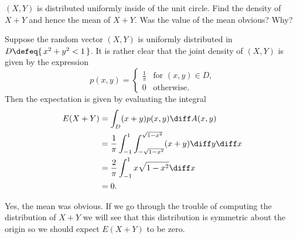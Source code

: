 \begin{problem}[Handout 18, \# 15]
  \((X,Y)\) is distributed uniformly inside of the unit circle. Find the
  density of \(X+Y\) and hence the mean of \(X+Y\). Was the value of the
  mean obvious? Why?
\end{problem}
\begin{solution}
  Suppose the random vector \((X,Y)\) is uniformly distributed in
  \(D\defeq \{\,x^2+y^2<1\,\}\). It is rather clear that the joint density
  of \((X,Y)\) is given by the expression
  \[
    p(x,y)=
    \begin{cases}
      \frac{1}{\pi}&\text{for \((x,y)\in D\),}\\
      0&\text{otherwise.}
    \end{cases}
  \]
  Then the expectation is given by evaluating the integral
  \begin{align*}
    E(X+Y)
    &=\int_D (x+y)p(x,y)\diff A(x,y)\\
    &=\frac{1}{\pi}\int_{-1}^1\int_{-\sqrt{1-x^2}}^{\sqrt{1-x^2}} (x+y)\diff
      y\diff x\\
    &=\frac{2}{\pi}\int_{-1}^1x\sqrt{1-x^2}\diff x\\
    &=0.
  \end{align*}

  Yes, the mean was obvious. If we go through the trouble of computing the
  distribution of \(X+Y\) we will see that this distribution is symmetric
  about the origin so we should expect \(E(X+Y)\) to be zero.
\end{solution}
\newpage

